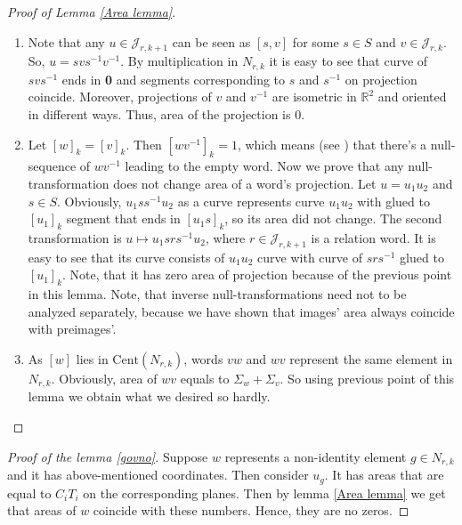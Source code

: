 \documentclass[11pt]{amsart}
\theoremstyle{plain}
\theoremstyle{definition}
\numberwithin{equation}{section}
\newcommand{\N}{N_{r,k}}
\newcommand{\RR}{\mathbb{R}}
\newcommand{\Cent}{\text{Cent}}
\newcommand{\Nrk}{N_{r,k}}
\begin{document}
\begin{proof}[Proof of Lemma \ref{Area lemma}]\ \\
\begin{enumerate}
    \item Note that any $u\in \mathcal{J}_{r,k+1}$ can be seen as $[s,v]$ for some $s\in S$ and $v\in \mathcal{J}_{r,k}$. So, $u = svs^{-1}v^{-1}$. By multiplication in $\N$ it is easy to see that curve of $svs^{-1}$ ends in {\bf 0} and segments corresponding to $s$ and $s^{-1}$ on projection coincide. Moreover, projections of $v$ and $v^{-1}$ are isometric in $\RR^2$ and oriented in different ways. Thus, area of the projection is $0$.
    
    \item Let $[w]_k = [v]_k$. Then $[wv^{-1}]_k = 1$, which means (see \cite{hours}) that there's a null-sequence of $wv^{-1}$ leading to the empty word. Now we prove that any null-transformation does not change area of a word's projection. Let $u = u_1u_2$ and $s\in S$. Obviously, $u_1ss^{-1}u_2$ as a curve represents curve $u_1u_2$ with glued to $[u_1]_k$ segment that ends in $[u_1s]_k$, so its area did not change. The second transformation is $u \mapsto u_1srs^{-1}u_2$, where $r\in \mathcal{J}_{r,k+1}$ is a relation word. It is easy to see that its curve consists of $u_1u_2$ curve with curve of $srs^{-1}$ glued to $[u_1]_k$. Note, that it has zero area of projection because of the previous point in this lemma. Note, that inverse null-transformations need not to be analyzed separately, because we have shown that images' area always coincide with preimages'.
    
    \item As $[w]$ lies in $ \Cent(\N)$, words $vw$ and $wv$ represent the same element in $\N$. Obviously, area of $wv$ equals to $\Sigma_w+\Sigma_v$. So using previous point of this lemma we obtain what we desired so hardly. 
    
\end{enumerate}

\end{proof}

\begin{proof}[Proof of the lemma \ref{govno}]
Suppose $w$ represents a non-identity element $g\in \Nrk$ and it has above-mentioned coordinates. Then consider $u_g$. It has areas that are equal to $C_iT_i$ on the corresponding planes. Then by lemma \ref{Area lemma} we get that areas of $w$ coincide with these numbers. Hence, they are no zeros. 
\end{proof}
\end{document}
